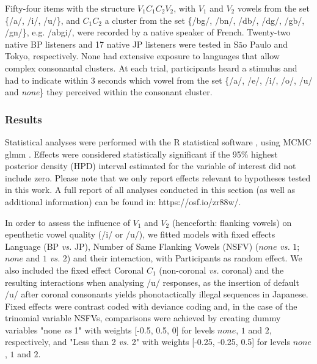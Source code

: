 Fifty-four items with the structure $V_{1}C_{1}C_{2}V_{2}$, with $V_{1}$ and $V_{2}$ vowels from the set \{/a/, /i/, /u/\}, and $C_{1}C_{2}$ a cluster from the set \{/bg/, /bn/, /db/, /dg/, /gb/, /gn/\}, e.g. /abgi/, were recorded by a native speaker of French. Twenty-two native BP listeners and 17 native JP listeners were tested in S\~{a}o Paulo and Tokyo, respectively. None had extensive exposure to languages that allow complex consonantal clusters. At each trial, participants heard a stimulus and had to indicate within 3 seconds which vowel from the set \{/a/, /e/, /i/, /o/, /u/ and \textit{none}\} they perceived within the consonant cluster. 

\subsubsection{Results}
Statistical analyses were performed with the R statistical software \cite{R-base}, using MCMC glmm \cite{R-MCMCglmm, R-coda}. Effects were considered statistically significant if the 95\% highest posterior density (HPD) interval estimated for the variable of interest did not include zero. Please note that we only report effects relevant to hypotheses tested in this work. A full report of all analyses conducted in this section (as well as additional information) can be found in: https://osf.io/zr88w/.

In order to assess the influence of $V_{1}$ and $V_{2}$ (henceforth: flanking vowels) on epenthetic vowel quality (/i/ or /u/), we fitted models with fixed effects Language (BP \textit{vs.} JP), Number of Same Flanking Vowels (NSFV) ($none$ \textit{vs.} $1$; $none$ and $1$ \textit{vs.} $2$) and their interaction, with Participants as random effect. We also included the fixed effect Coronal $C_{1}$ (non-coronal \textit{vs.} coronal) and the resulting interactions when analysing /u/ responses, as the insertion of default /u/ after coronal consonants yields phonotactically illegal sequences in Japanese. Fixed effects were contrast coded with deviance coding and, in the case of the trinomial variable NSFVs, comparisons were achieved by creating dummy variables "none \textit{vs} 1" with weights [-0.5, 0.5, 0] for levels $none$, $1$ and $2$, respectively, and "Less than 2 \textit{vs.} 2" with weights [-0.25, -0.25, 0.5] for levels $none$, $1$ and $2$.

